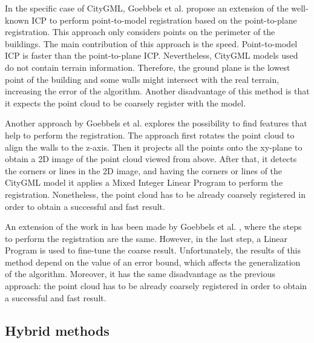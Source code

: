         In the specific case of CityGML, Goebbels et al. \cite{Goebbels_2019_icpcitygml} propose an extension of the well-known ICP
        to perform point-to-model registration based on the point-to-plane registration.
        This approach only considers points on the perimeter of the buildings.
        The main contribution of this approach is the speed. Point-to-model ICP is faster than the point-to-plane ICP.
        Nevertheless, CityGML models used do not contain terrain information. 
        Therefore, the ground plane is the lowest point of the building and some walls might intersect with the real terrain, increasing the error of the algorithm.
        Another disadvantage of this method is that it expects the point cloud to be coarsely register with the model.

        Another approach by Goebbels et al. \cite{Goebbels_2018_linebased} explores the possibility to find features that help to perform the registration.
        The approach first rotates the point cloud to align the walls to the z-axis. Then it projects all the points onto the 
        xy-plane to obtain a 2D image of the point cloud viewed from above. After that, it detects the corners or lines in the 2D image,
        and having the corners or lines of the CityGML model it applies a Mixed Integer Linear Program to perform the registration.
        Nonetheless, the point cloud has to be already coarsely registered in order to obtain a successful and fast result.

        An extension of the work in \cite{Goebbels_2018_linebased} has been made by Goebbels et al. \cite{Goebbels_2018_alinear}, 
        where the steps to perform the registration are the same.
        However, in the last step, a Linear Program is used to fine-tune the coarse result. 
        Unfortunately, the results of this method depend on the value of an error bound, which affects the generalization of the algorithm.
        Moreover, it has the same disadvantage as the previous approach: 
        the point cloud has to be already coarsely registered in order to obtain a successful and fast result.
    
        \subsection{Hybrid methods}

        
        

